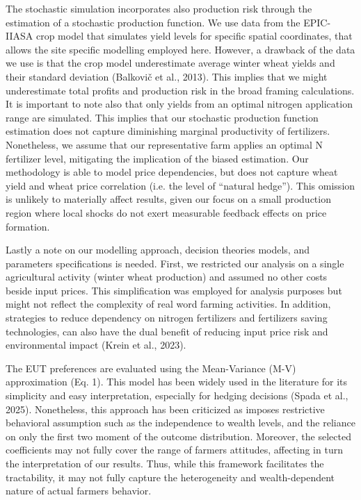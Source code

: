 \documentclass[
]{article}
\begin{document}
The stochastic simulation incorporates also production risk through the
estimation of a stochastic production function. We use data from the
EPIC-IIASA crop model that simulates yield levels for specific spatial
coordinates, that allows the site specific modelling employed here.
However, a drawback of the data we use is that the crop model
underestimate average winter wheat yields and their standard deviation
(Balkovič et al., 2013). This implies that we might underestimate total
profits and production risk in the broad framing calculations. It is
important to note also that only yields from an optimal nitrogen
application range are simulated. This implies that our stochastic
production function estimation does not capture diminishing marginal
productivity of fertilizers. Nonetheless, we assume that our
representative farm applies an optimal N fertilizer level, mitigating
the implication of the biased estimation. Our methodology is able to
model price dependencies, but does not capture wheat yield and wheat
price correlation (i.e. the level of ``natural hedge''). This omission
is unlikely to materially affect results, given our focus on a small
production region where local shocks do not exert measurable feedback
effects on price formation.

Lastly a note on our modelling approach, decision theories models, and
parameters specifications is needed. First, we restricted our analysis
on a single agricultural activity (winter wheat production) and assumed
no other costs beside input prices. This simplification was employed for
analysis purposes but might not reflect the complexity of real word
farming activities. In addition, strategies to reduce dependency on
nitrogen fertilizers and fertilizers saving technologies, can also have
the dual benefit of reducing input price risk and environmental impact
(Krein et al., 2023).

The EUT preferences are evaluated using the Mean-Variance (M-V)
approximation (Eq. 1). This model has been widely used in the literature
for its simplicity and easy interpretation, especially for hedging
decisions (Spada et al., 2025). Nonetheless, this approach has been
criticized as imposes restrictive behavioral assumption such as the
independence to wealth levels, and the reliance on only the first two
moment of the outcome distribution. Moreover, the selected coefficients
may not fully cover the range of farmers attitudes, affecting in turn
the interpretation of our results. Thus, while this framework
facilitates the tractability, it may not fully capture the heterogeneity
and wealth-dependent nature of actual farmers behavior.
\end{document}
